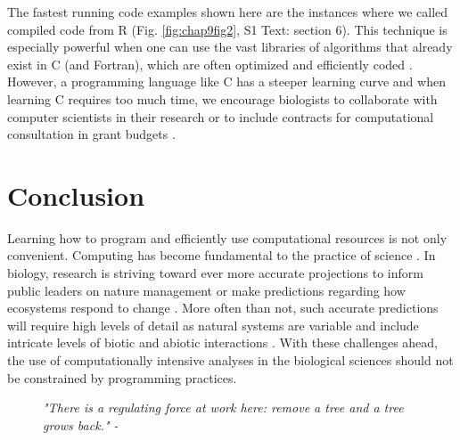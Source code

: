 \documentclass[b5paper,justified]{tufte-book} %
\begin{document}
\begin{fullwidth}
The fastest running code examples shown here are the instances where we called compiled code from R (Fig. \ref{fig:chap9fig2}, S1 Text: section 6). This technique is especially powerful when one can use the vast libraries of algorithms that already exist in C (and Fortran), which are often optimized and efficiently coded \citep{Chambers2009}. However, a programming language like C has a steeper learning curve and when learning C requires too much time, we encourage biologists to collaborate with computer scientists in their research or to include contracts for computational consultation in grant budgets \citep{Wilson2012}.

\section{Conclusion}
Learning how to program and efficiently use computational resources is not only convenient. Computing has become fundamental to the practice of science \citep[e.g.][]{Merali2010, Wilson2012, Petrovskii2012, Michener2012}. In biology, research is striving toward ever more accurate projections to inform public leaders on nature management or make predictions regarding how ecosystems respond to change \citep[e.g.][]{Isbell2011, Brook2000, Guisan2006}. More often than not, such accurate predictions will require high levels of detail as natural systems are variable and include intricate levels of biotic and abiotic interactions \citep[e.g.][]{Bohrer2009, Moran2011}. With these challenges ahead, the use of computationally intensive analyses in the biological sciences should not be constrained by programming practices. 

\end{fullwidth}

\vspace*{20cm}

\begin{landscape}
\begin{figure}
\vspace*{-.6cm}\hspace*{4.4cm}
\hspace*{5cm}\begin{minipage}{18cm} 
\textit{ \footnotesize "There is a regulating force at work here: remove a tree and a tree grows back." - \citet{Condit1992a}}

\end{minipage}
\end{figure}
\end{landscape}
\end{document}
